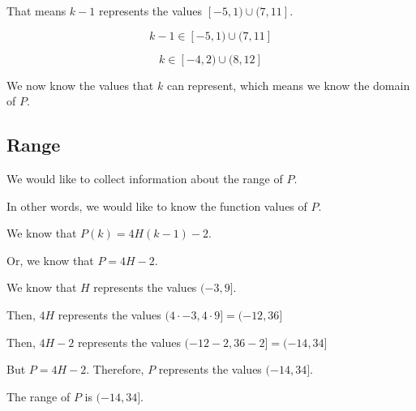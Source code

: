 \documentclass{ximera}
\begin{document}
That means $k-1$ represents the values  $[-5, 1) \cup (7, 11]$.


\[
k - 1 \in [-5, 1) \cup (7, 11]
\]


\[
k \in [-4, 2) \cup (8, 12]
\]



We now know the values that $k$ can represent, which means we know the domain of $P$. 












\subsection*{Range}


We would like to collect information about the range of $P$. 

In other words, we would like to know the function values of $P$. 


We know that $P(k) = 4 H(k-1) - 2$.


Or, we know that $P = 4 H - 2$. 



We know that $H$ represents the values $(-3, 9]$. 


Then, $4 H$ represents the values $(4 \cdot -3, 4 \cdot 9] = (-12, 36]$ 



Then, $4 H - 2$ represents the values $(-12 - 2, 36 - 2] = (-14, 34]$ 


But $P = 4 H - 2$.  Therefore, $P$ represents the values $(-14, 34]$. 


The range of $P$ is $(-14, 34]$.
\end{document}
